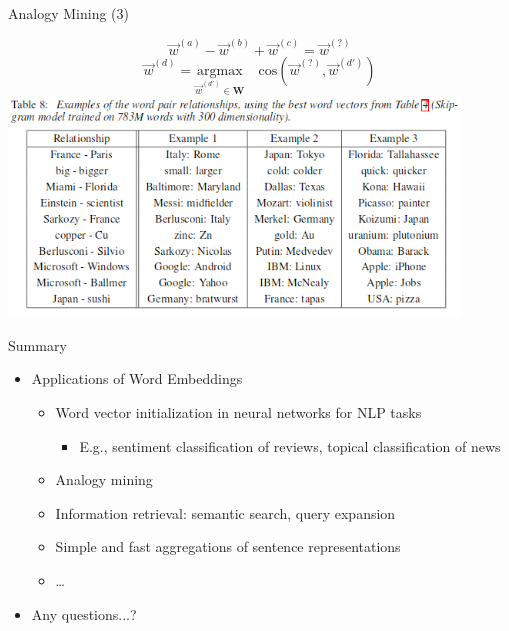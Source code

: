 \begin{vbframe}{Analogy Mining (3)}

\vfill

\begin{center}
$$\vec w^{(a)} - \vec w^{(b)} +  \vec w^{(c)} = \vec w^{(?)}$$
$$\vec w^{(d)} = \underset{\vec w^{(d')} \in \mathbf{W}}{\mathrm{argmax}} \quad \mathrm{cos}(\vec w^{(?)}, \vec w^{(d')})$$
\includegraphics[width = 0.9\textwidth]{figure/similar_relationships}
\end{center}

\vfill

\end{vbframe}


\begin{vbframe}{Summary}

\vfill

\begin{itemize}
	\item Applications of Word Embeddings
		\begin{itemize}
			\item Word vector initialization in neural networks for NLP tasks
				\begin{itemize}
					\item E.g., sentiment classification of reviews, topical classification of news 
				\end{itemize}
			\item Analogy mining
			\item Information retrieval: semantic search, query expansion
			\item Simple and fast aggregations of sentence representations
			\item \dots
		\end{itemize}
	\item Any questions...?
\end{itemize}

\vfill

\end{vbframe}


\endlecture

